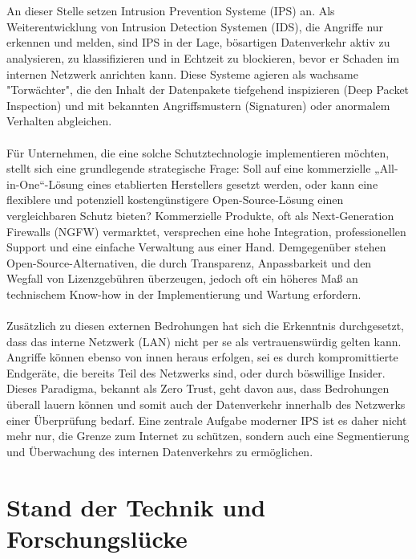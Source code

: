 \\\\
An dieser Stelle setzen Intrusion Prevention Systeme (IPS) an. Als Weiterentwicklung von Intrusion Detection Systemen (IDS), die Angriffe nur erkennen und melden, sind IPS in der Lage, bösartigen Datenverkehr aktiv zu analysieren, zu klassifizieren und in Echtzeit zu blockieren, bevor er Schaden im internen Netzwerk anrichten kann. Diese Systeme agieren als wachsame "Torwächter", die den Inhalt der Datenpakete tiefgehend inspizieren (Deep Packet Inspection) und mit bekannten Angriffsmustern (Signaturen) oder anormalem Verhalten abgleichen.
\\\\
Für Unternehmen, die eine solche Schutztechnologie implementieren möchten, stellt sich eine grundlegende strategische Frage: Soll auf eine kommerzielle „All-in-One“-Lösung eines etablierten Herstellers gesetzt werden, oder kann eine flexiblere und potenziell kostengünstigere Open-Source-Lösung einen vergleichbaren Schutz bieten? Kommerzielle Produkte, oft als Next-Generation Firewalls (NGFW) vermarktet, versprechen eine hohe Integration, professionellen Support und eine einfache Verwaltung aus einer Hand. Demgegenüber stehen Open-Source-Alternativen, die durch Transparenz, Anpassbarkeit und den Wegfall von Lizenzgebühren überzeugen, jedoch oft ein höheres Maß an technischem Know-how in der Implementierung und Wartung erfordern.\\\\

Zusätzlich zu diesen externen Bedrohungen hat sich die Erkenntnis durchgesetzt, dass das interne Netzwerk (LAN) nicht per se als vertrauenswürdig gelten kann. Angriffe können ebenso von innen heraus erfolgen, sei es durch kompromittierte Endgeräte, die bereits Teil des Netzwerks sind, oder durch böswillige Insider. Dieses Paradigma, bekannt als Zero Trust, geht davon aus, dass Bedrohungen überall lauern können und somit auch der Datenverkehr innerhalb des Netzwerks einer Überprüfung bedarf. Eine zentrale Aufgabe moderner IPS ist es daher nicht mehr nur, die Grenze zum Internet zu schützen, sondern auch eine Segmentierung und Überwachung des internen Datenverkehrs zu ermöglichen.
\section{Stand der Technik und Forschungslücke}

